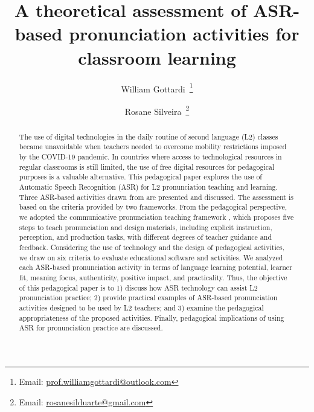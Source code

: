 \documentclass[english]{textolivre}
\title{A theoretical assessment of ASR-based pronunciation activities for classroom learning}
\author[1]{William Gottardi~\orcid{0000-0002-1291-3953}\thanks{Email: \href{mailto:prof.williamgottardi@outlook.com}{prof.williamgottardi@outlook.com}}}
\author[1]{Rosane Silveira~\orcid{0000-0003-0329-0376}\thanks{Email: \href{mailto:rosanesilduarte@gmail.com}{rosanesilduarte@gmail.com}}}
\affil[1]{Federal University of Santa Catarina, English: Linguistic and Literary Studies Program, Department of Foreign Languages and Literature, Florianópolis, SC, Brazil.}
\begin{document}
\maketitle

\begin{polyabstract}
\begin{abstract}
The use of digital technologies in the daily routine
of second language (L2) classes became unavoidable when teachers needed
to overcome mobility restrictions imposed by the COVID-19 pandemic. In
countries where access to technological resources in regular classrooms
is still limited, the use of free digital resources for pedagogical
purposes is a valuable alternative. This pedagogical paper explores the
use of Automatic Speech Recognition (ASR) for L2 pronunciation teaching
and learning. Three ASR-based activities drawn from \textcite{gottardi2023} are
presented and discussed. The assessment is based on the criteria
provided by two frameworks. From the pedagogical perspective, we adopted
the communicative pronunciation teaching framework \cite{celcemurcia2010}, which proposes five steps to teach pronunciation
and design materials, including explicit instruction, perception, and
production tasks, with different degrees of teacher guidance and
feedback. Considering the use of technology and the design of
pedagogical activities, we draw on  six criteria to
evaluate educational software and activities. We analyzed each ASR-based
pronunciation activity in terms of language learning potential, learner
fit, meaning focus, authenticity, positive impact, and practicality.
Thus, the objective of this pedagogical paper is to 1) discuss how ASR
technology can assist L2 pronunciation practice; 2) provide practical
examples of ASR-based pronunciation activities designed to be used by L2
teachers; and 3) examine the pedagogical appropriateness of the proposed
activities. Finally, pedagogical implications of using ASR for
pronunciation practice are discussed.

\end{abstract}


\end{polyabstract}
\end{document}
